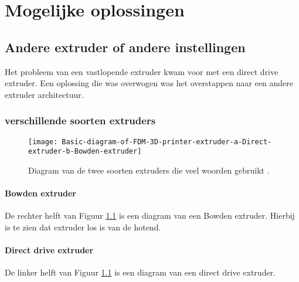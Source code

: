 \chapter{Mogelijke oplossingen}
\label{Mogelijke_oplossingen}

\section{Andere extruder of andere instellingen}

Het probleem van een vastlopende extruder kwam voor met een direct drive
extruder. Een oplossing die was overwogen was het overstappen naar een andere
extruder architectuur.

\subsection{verschillende soorten extruders}

\begin{figure}[h]
    \centerline{\texttt{[image: Basic-diagram-of-FDM-3D-printer-extruder-a-Direct-extruder-b-Bowden-extruder]}}
    \caption{Diagram van de twee soorten extruders die veel woorden gebruikt \cite{soorten_extruders}.}
    \label{fig:soorten_extruders}
\end{figure}

\subsubsection{Bowden extruder}
\label{ss:Bowden_extruder}

De rechter helft van Figuur \ref{fig:soorten_extruders} \cite{soorten_extruders}
is een diagram van een Bowden extruder. Hierbij is te zien dat \ac{extruder} los
is van de \ac{hotend}. 

\subsubsection{Direct drive extruder}
\label{ss:direct_drive_extruder}

De linker helft van Figuur \ref{fig:soorten_extruders} \cite{soorten_extruders}
is een diagram van een direct drive extruder. 

\subsection{}

